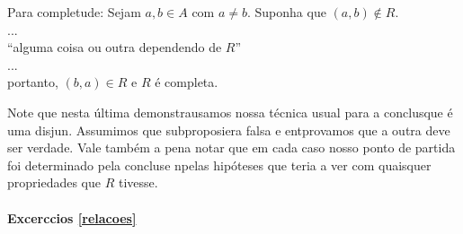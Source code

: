 Para completude: Sejam $a,b\in A$ com $a\neq b$. Suponha que $(a,b)\notin R$.
\\
...
\\ 
``alguma coisa ou outra dependendo de $R$''
\\
...
\\
portanto, $(b,a)\in R$ e $R$ \'e completa.

Note que nesta \'ultima demonstra\cao usamos nossa t\'ecnica usual para a conclus\ao que \'e uma disjun\caoi. Assumimos que subproposi\cao era falsa e ent\ao provamos que a outra deve ser verdade. Vale tamb\'em a pena notar que em cada caso nosso ponto de partida foi determinado pela conclus\ao e n\ao pelas hip\'oteses que teria a ver com quaisquer propriedades que $R$ tivesse.

\paragraph{Excerc\ih cios \ref{relacoes}}

